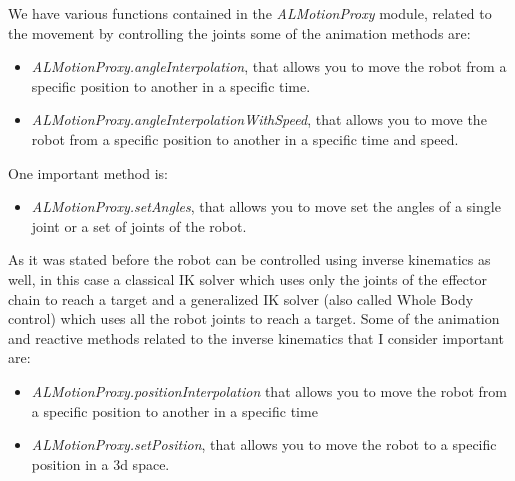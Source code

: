 \documentclass[conference]{IEEEtran}
\begin{document}
We have various functions contained in the \textit{ALMotionProxy} module, related to the movement by controlling the joints some of the animation methods are:
\begin{itemize}
    \item \textit{ALMotionProxy.angleInterpolation}, that allows you to move the robot from a specific position to another in a specific time.
    \item \textit{ALMotionProxy.angleInterpolationWithSpeed}, that allows you to move the robot from a specific position to another in a specific time and speed.
\end{itemize}
One important method is:
\begin{itemize}
    \item \textit{ALMotionProxy.setAngles}, that allows you to move set the angles of a single joint or a set of joints of the robot.
\end{itemize}

As it was stated before the robot can be controlled using inverse kinematics as well, in this case a classical IK solver which uses only the joints of the effector chain to reach a target and a generalized IK solver (also called Whole Body control) which uses all the robot joints to reach a target.
Some of the animation and reactive methods related to the inverse kinematics that I consider important are:
\begin{itemize}
    \item \textit{ALMotionProxy.positionInterpolation} that allows you to move the robot from a specific position to another in a specific time 
    \item \textit{ALMotionProxy.setPosition}, that allows you to move the robot to a specific position in a 3d space.
\end{itemize}
\end{document}
